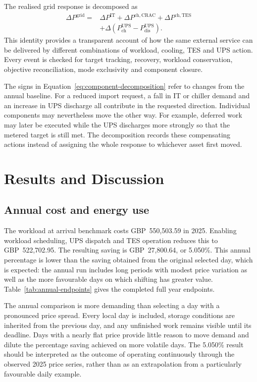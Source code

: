 The realised grid response is decomposed as
\begin{equation}
 \begin{split}
 \Delta P^{\mathrm{grid}}={}&\Delta P^{\mathrm{IT}}+
 \Delta P^{\mathrm{ch,CRAC}}+\Delta P^{\mathrm{ch,TES}}\\
 &+\Delta(P^{\mathrm{UPS}}_{\mathrm{ch}}-
 P^{\mathrm{UPS}}_{\mathrm{dis}}).
 \end{split}
 \label{eq:component-decomposition}
\end{equation}
This identity provides a transparent account of how the same external service
can be delivered by different combinations of workload, cooling, TES and UPS
action. Every event is checked for target tracking, recovery, workload
conservation, objective reconciliation, mode exclusivity and component closure.

The signs in Equation~\eqref{eq:component-decomposition} refer to changes from
the annual baseline. For a reduced import request, a fall in IT or chiller demand
and an increase in UPS discharge all contribute in the requested direction.
Individual components may nevertheless move the other way. For example, deferred
work may later be executed while the UPS discharges more strongly so that the
metered target is still met. The decomposition records these compensating
actions instead of assigning the whole response to whichever asset first moved.

\section{Results and Discussion}\label{sec:results}

\subsection{Annual cost and energy use}

The workload at arrival benchmark costs GBP~550,503.59 in 2025. Enabling
workload scheduling, UPS dispatch and TES operation reduces this to
GBP~522,702.95. The resulting saving is GBP~27,800.64, or 5.050\%. This annual
percentage is lower than the saving obtained from the original selected day,
which is expected: the annual run includes long periods with modest price
variation as well as the more favourable days on which shifting has greater
value. Table~\ref{tab:annual-endpoints} gives the completed full year endpoints.

The annual comparison is more demanding than selecting a day with a pronounced
price spread. Every local day is included, storage conditions are inherited from
the previous day, and any unfinished work remains visible until its deadline.
Days with a nearly flat price provide little reason to move demand and dilute the
percentage saving achieved on more volatile days. The 5.050\% result should be
interpreted as the outcome of operating continuously through the
observed 2025 price series, rather than as an extrapolation from a particularly
favourable daily example.

